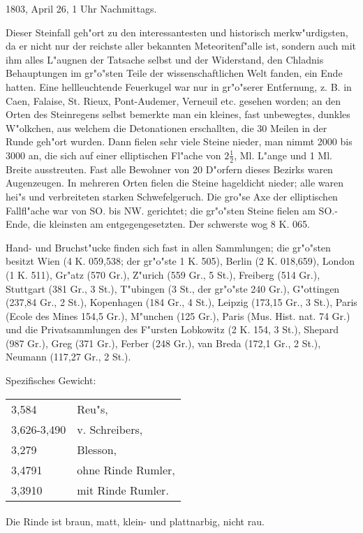 \documentclass[a4paper, 11pt, oneside]{article}
\begin{document}
1803, April 26, 1 Uhr Nachmittags.

Dieser Steinfall geh"ort zu den interessantesten und historisch merkw"urdigsten, da er nicht nur der reichste aller bekannten Meteoritenf"alle ist, sondern auch mit ihm alles L"augnen der Tatsache selbst und der Widerstand, den Chladnis Behauptungen im gr"o"sten Teile der wissenschaftlichen Welt fanden, ein Ende hatten. Eine hellleuchtende Feuerkugel war nur in gr"o"serer Entfernung, z. B. in Caen, Falaise, St. Rieux, Pont-Audemer, Verneuil etc. gesehen worden; an den Orten des Steinregens selbst bemerkte man ein kleines, fast unbewegtes, dunkles W"olkchen, aus welchem die Detonationen erschallten, die 30 Meilen in der Runde geh"ort wurden. Dann fielen sehr viele Steine nieder, man nimmt 2000 bis 3000 an, die sich auf einer elliptischen Fl"ache von $2\frac{1}{2}$, Ml. L"ange und 1 Ml. Breite ausstreuten. Fast alle Bewohner von 20 D"orfern dieses Bezirks waren Augenzeugen. In mehreren Orten fielen die Steine hageldicht nieder; alle waren hei"s und verbreiteten starken Schwefelgeruch. Die gro"se Axe der elliptischen Fallfl"ache war von SO. bis NW. gerichtet; die gr"o"sten Steine fielen am SO.-Ende, die kleinsten am entgegengesetzten. Der schwerste wog 8 K. 065.

Hand- und Bruchst"ucke finden sich fast in allen Sammlungen; die gr"o"sten besitzt Wien (4 K. 059,538; der gr"o"ste 1 K. 505), Berlin (2 K. 018,659), London (1 K. 511), Gr"atz (570 Gr.), Z"urich (559 Gr., 5 St.), Freiberg (514 Gr.), Stuttgart (381 Gr., 3 St.), T"ubingen (3 St., der gr"o"ste 240 Gr.), G"ottingen (237,84 Gr., 2 St.), Kopenhagen (184 Gr., 4 St.), Leipzig (173,15 Gr., 3 St.), Paris (Ecole des Mines 154,5 Gr.), M"unchen (125 Gr.), Paris (Mus. Hist. nat. 74 Gr.) und die Privatsammlungen des F"ursten Lobkowitz (2 K. 154, 3 St.), Shepard (987 Gr.), Greg (371 Gr.), Ferber (248 Gr.), van Breda (172,1 Gr., 2 St.), Neumann (117,27 Gr., 2 St.).

Spezifisches Gewicht:
\begin{table}[!ht]
    \centering
    \begin{tabular}{l l}
        3,584 & Reu"s,\\
        3,626-3,490 & v. Schreibers,\\
        3,279 & Blesson,\\
        3,4791 & ohne Rinde Rumler,\\
        3,3910 & mit Rinde Rumler.
    \end{tabular}
\end{table}
\paragraph{}
Die Rinde ist braun, matt, klein- und plattnarbig, nicht rau.
\end{document}
